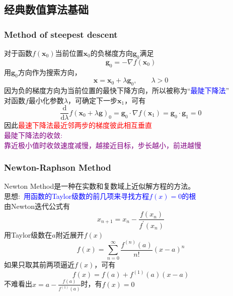 \subsection{经典数值算法基础}
\frame
{
	\frametitle{\textrm{Method of steepest descent}}
	对于函数$f(\mathbf{x}_0)$当前位置$\mathbf{x}_0$的负梯度方向$\mathbf{g}_0$满足
	\begin{displaymath}
		\mathbf{g}_0=-\nabla f(\mathbf{x}_0)
	\end{displaymath}
	用$\mathbf{g}_0$方向作为搜索方向，
	\begin{displaymath}
		\mathbf{x}=\mathbf{x}_0+\lambda\mathbf{g}_0,\qquad \lambda>0
	\end{displaymath}
	因为负的梯度方向为当前位置的最快下降方向，所以被称为“\textcolor{blue}{最陡下降法}”\\
	对函数$f$最小化参数$\lambda$，可确定下一步$\mathbf{x}_1$，可有
	\begin{displaymath}
		\dfrac{\mathrm{d}}{\mathrm{d}\lambda}f(\mathbf{x}_0+\lambda\mathbf{g})_0=\mathbf{g}_0\cdot\nabla f(\mathbf{x}_1)=\mathbf{g}_0\cdot\mathbf{g}_1=0
	\end{displaymath}
	因此\textcolor{red}{最速下降法最近邻两步的梯度彼此相互垂直}\\
	\textcolor{purple}{最陡下降法的收敛:~\\靠近极小值时收敛速度减慢，越接近目标，步长越小，前进越慢}
}

\frame
{
	\frametitle{\textrm{Newton-Raphson Method}}
	\textrm{Newton Method}是一种在实数和复数域上近似解方程的方法。\\
	思想:~\textcolor{blue}{用函数的\textrm{Taylor}级数的前几项来寻找方程$f(x)=0$的根}\\
	由\textrm{Newton}迭代公式有
	\begin{displaymath}
		x_{n+1}=x_n-\dfrac{f(x_n)}{f^{\prime}(x_n)}
	\end{displaymath}
	用\textrm{Taylor}级数在$a$附近展开$f(x)$
	\begin{displaymath}
		f(x)=\sum_{n=0}^{\infty}\dfrac{f^{(n)}(a)}{n!}(x-a)^n
	\end{displaymath}
	如果只取其前两项逼近$f(x)$，可有
	\begin{displaymath}
		f(x)=f(a)+f^{(1)}(a)(x-a)
	\end{displaymath}
	不难看出$x=a-\frac{f(a)}{f^{(1)}(a)}$时，有$f(x)=0$
}

